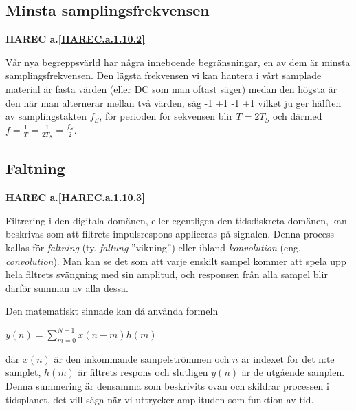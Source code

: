 \subsection{Minsta samplingsfrekvensen}
\textbf{HAREC a.\ref{HAREC.a.1.10.2}\label{myHAREC.a.1.10.2}}


Vår nya begreppsvärld har några inneboende begränsningar, en av dem är minsta
samplingsfrekvensen.
Den lägsta frekvensen vi kan hantera i vårt samplade material är fasta värden
(eller DC som man oftast säger) medan den högsta är den när man alternerar
mellan två värden, säg -1 +1 -1 +1 vilket ju ger hälften av samplingstakten
\(f_S\), för perioden för sekvensen blir \(T = 2T_S\) och därmed
\(f=\frac{1}{T}=\frac{1}{2T_S}=\frac{f_S}{2}\).

\subsection{Faltning}
\textbf{HAREC a.\ref{HAREC.a.1.10.3}\label{myHAREC.a.1.10.3}}

Filtrering i den digitala domänen, eller egentligen den tidsdiskreta domänen,
kan beskrivas som att filtrets impulsrespons appliceras på signalen. Denna
process kallas för \emph{faltning} (ty. \emph{faltung} ''vikning'') eller ibland
\emph{konvolution} (eng. \emph{convolution}).
Man kan se det som att varje enskilt sampel kommer att spela upp hela filtrets
svängning med sin amplitud, och responsen från alla sampel blir därför summan
av alla dessa.

Den matematiskt sinnade kan då använda formeln

\(y(n) = \sum_{m=0}^{N-1} x(n-m)h(m)\)

där \(x(n)\) är den inkommande sampelströmmen och \(n\) är indexet för det
n:te samplet, \(h(m)\) är filtrets respons och slutligen \(y(n)\) är de utgående
samplen.
Denna summering är densamma som beskrivits ovan och skildrar processen
i tidsplanet, det vill säga när vi uttrycker amplituden som funktion av tid.

